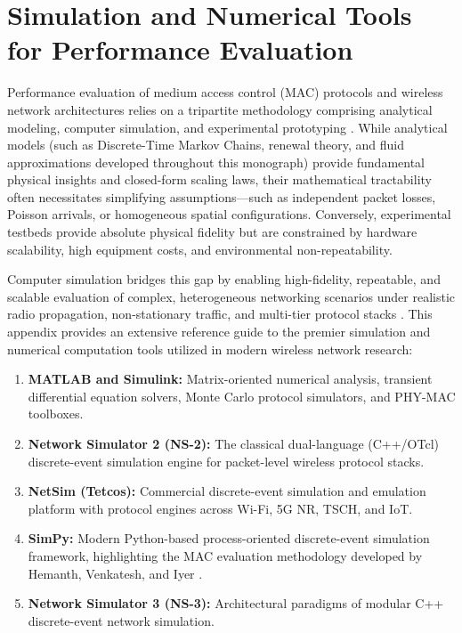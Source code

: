 \chapter{Simulation and Numerical Tools for Performance Evaluation}
\label{sec:appendix_sim_tools}

Performance evaluation of medium access control (MAC) protocols and wireless network architectures relies on a tripartite methodology comprising analytical modeling, computer simulation, and experimental prototyping \cite{kumar2004communication, bertsekas1992data}. While analytical models (such as Discrete-Time Markov Chains, renewal theory, and fluid approximations developed throughout this monograph) provide fundamental physical insights and closed-form scaling laws, their mathematical tractability often necessitates simplifying assumptions—such as independent packet losses, Poisson arrivals, or homogeneous spatial configurations. Conversely, experimental testbeds provide absolute physical fidelity but are constrained by hardware scalability, high equipment costs, and environmental non-repeatability.

Computer simulation bridges this gap by enabling high-fidelity, repeatable, and scalable evaluation of complex, heterogeneous networking scenarios under realistic radio propagation, non-stationary traffic, and multi-tier protocol stacks \cite{fall2003ns, henderson2008network}. This appendix provides an extensive reference guide to the premier simulation and numerical computation tools utilized in modern wireless network research:
\begin{enumerate}
    \item \textbf{MATLAB and Simulink:} Matrix-oriented numerical analysis, transient differential equation solvers, Monte Carlo protocol simulators, and PHY-MAC toolboxes.
    \item \textbf{Network Simulator 2 (NS-2):} The classical dual-language (C++/OTcl) discrete-event simulation engine for packet-level wireless protocol stacks.
    \item \textbf{NetSim (Tetcos):} Commercial discrete-event simulation and emulation platform with protocol engines across Wi-Fi, 5G NR, TSCH, and IoT.
    \item \textbf{SimPy:} Modern Python-based process-oriented discrete-event simulation framework, highlighting the MAC evaluation methodology developed by Hemanth, Venkatesh, and Iyer \cite{hemanth2010simpy}.
    \item \textbf{Network Simulator 3 (NS-3):} Architectural paradigms of modular C++ discrete-event network simulation.
\end{enumerate}

